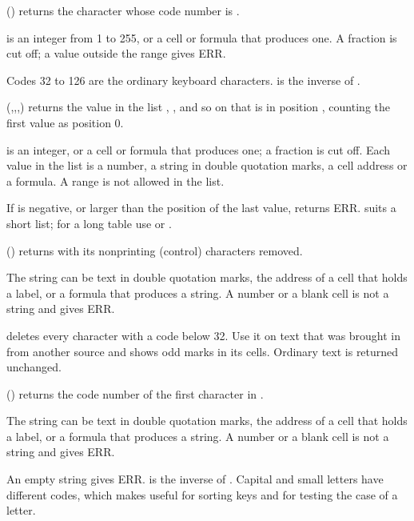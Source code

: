 \Examples
{}

() returns the character whose code number is .

 is an integer from 1 to 255, or a cell or formula that produces one. A fraction is cut off; a value outside the range gives ERR.

Codes 32 to 126 are the ordinary keyboard characters.  is the inverse of .

\Examples
{}

(,,,) returns the value in the list , , and so on that is in position , counting the first value as position 0.

 is an integer, or a cell or formula that produces one; a fraction is cut off. Each value in the list is a number, a string in double quotation marks, a cell address or a formula. A range is not allowed in the list.

If  is negative, or larger than the position of the last value,  returns ERR.  suits a short list; for a long table use  or .

\Examples
{}

() returns  with its nonprinting (control) characters removed.

The string can be text in double quotation marks, the address of a cell that holds a label, or a formula that produces a string. A number or a blank cell is not a string and gives ERR.

 deletes every character with a code below 32. Use it on text that was brought in from another source and shows odd marks in its cells. Ordinary text is returned unchanged.

\Examples
{}

() returns the code number of the first character in .

The string can be text in double quotation marks, the address of a cell that holds a label, or a formula that produces a string. A number or a blank cell is not a string and gives ERR.

An empty string gives ERR.  is the inverse of . Capital and small letters have different codes, which makes  useful for sorting keys and for testing the case of a letter.

